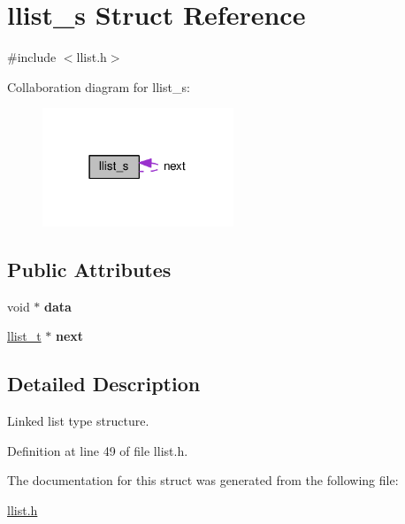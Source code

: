 \hypertarget{structllist__s}{}\section{llist\+\_\+s Struct Reference}
\label{structllist__s}


{\ttfamily \#include $<$llist.\+h$>$}



Collaboration diagram for llist\+\_\+s\+:\nopagebreak
\begin{figure}[H]
\begin{center}
\leavevmode
\includegraphics[width=162pt]{structllist__s__coll__graph}
\end{center}
\end{figure}
\subsection*{Public Attributes}
\begin{DoxyCompactItemize}
\item 
void $\ast$ {\bfseries data}\hypertarget{structllist__s_ac692797e6d05bfa132958448f844ede7}{}\label{structllist__s_ac692797e6d05bfa132958448f844ede7}

\item 
\hyperlink{llist_8h_a90862badf6f9cc4e3d6348b7d60ce4f0}{llist\+\_\+t} $\ast$ {\bfseries next}\hypertarget{structllist__s_a45d1670b5b74a3e985cfa2640a721f87}{}\label{structllist__s_a45d1670b5b74a3e985cfa2640a721f87}

\end{DoxyCompactItemize}


\subsection{Detailed Description}
Linked list type structure. 

Definition at line 49 of file llist.\+h.



The documentation for this struct was generated from the following file\+:\begin{DoxyCompactItemize}
\item 
\hyperlink{llist_8h}{llist.\+h}\end{DoxyCompactItemize}
